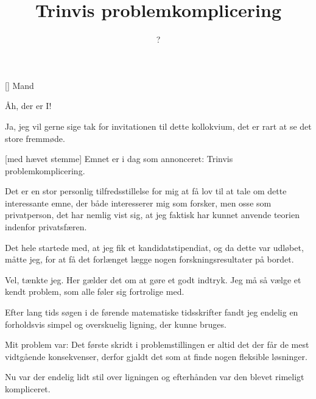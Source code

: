 \documentclass[a4paper,11pt]{article}
\title{Trinvis problemkomplicering}
\author{?}
\begin{document}
\maketitle

\begin{roles}
  [] Mand
\end{roles}


\begin{sketch}


   Åh, der er I! 

   Ja, jeg vil gerne sige tak for invitationen til dette
  kollokvium, det er rart at se det store fremmøde.

  [med hævet stemme] Emnet er i dag som annonceret: Trinvis problemkomplicering.

   Det er en stor personlig tilfredsstillelse for mig at få
  lov til at tale om dette interessante emne, der både interesserer
  mig som forsker, men osse som privatperson, det har nemlig vist sig,
  at jeg faktisk har kunnet anvende teorien indenfor privatsfæren.

   Det hele startede med, at jeg fik et kandidatstipendiat, og
  da dette var udløbet, måtte jeg, for at få det forlænget lægge nogen
  forskningsresultater på bordet.

   Vel, tænkte jeg.  Her gælder det om at gøre et godt
  indtryk.  Jeg må så vælge et kendt problem, som alle føler sig
  fortrolige med.

   Efter lang tids søgen i de førende matematiske tidsskrifter
  fandt jeg endelig en forholdsvis simpel og overskuelig ligning, der
  kunne bruges.


   Mit problem var: Det første skridt i problemstillingen er
  altid det der får de mest vidtgående konsekvenser, derfor gjaldt det
  som at finde nogen fleksible løsninger.


   Nu var der endelig lidt stil over ligningen og efterhånden
  var den blevet rimeligt kompliceret.



\end{sketch}
\end{document}
